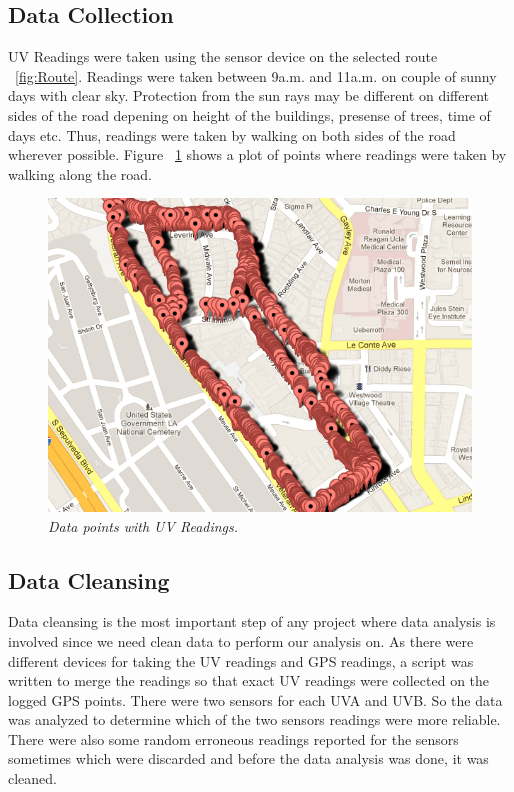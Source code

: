 \documentclass[conference]{IEEETran}
\begin{document}
\subsection{Data Collection}
UV Readings were taken using the sensor device on the selected route ~\ref{fig:Route}. Readings were taken between 9a.m. and 11a.m. on couple of sunny days with clear sky. Protection from the sun rays may be different on different sides of the road depening on height of the buildings, presense of trees, time of days etc. Thus, readings were taken by walking on both sides of the road wherever possible. Figure ~\ref{fig:dataPoints} shows a plot of points where readings were taken by walking along the road.
\begin{figure}
\begin{center}
\includegraphics[scale=0.4]{dataPoints.png}
\caption{\small \sl Data points with UV Readings.\label{fig:dataPoints}}
\end{center}
\end{figure}


\subsection{Data Cleansing}
Data cleansing is the most important step of any project where data analysis is involved since we need clean data to perform our analysis on. As there were different devices for taking the UV readings and GPS readings, a script was written to merge the readings so that exact UV readings were collected on the logged GPS points. There were two sensors for each UVA and UVB. So the data was analyzed to determine which of the two sensors readings were more reliable. There were also some random erroneous readings reported for the sensors sometimes which were discarded and before the data analysis was done, it was cleaned. 
\end{document}
